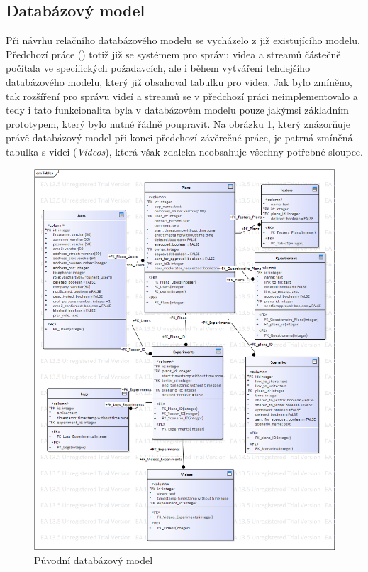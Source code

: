 \documentclass[thesis=M,czech]{FITthesis}[2012/06/26]
\begin{document}
\subsection{Databázový model} \label{subsec:navrh_backend_databaze}
Při návrhu relačního databázového modelu se vycházelo z již existujícího modelu. Předchozí práce (\cite{solankar}) totiž již se systémem pro správu videa a streamů částečně počítala ve specifických požadavcích, ale i během vytváření tehdejšího databázového modelu, který již obsahoval tabulku pro videa. Jak bylo zmíněno, tak rozšíření pro správu videí a streamů se v předchozí práci neimplementovalo a tedy i tato funkcionalita byla v databázovém modelu pouze jakýmsi základním prototypem, který bylo nutné řádně poupravit. Na obrázku \ref{img:navrh_backend_db_orig}, který znázorňuje právě databázový model při konci předchozí závěrečné práce, je patrná zmíněná tabulka s videi (\textit{Videos}), která však zdaleka neobsahuje všechny potřebné sloupce.
\\
\begin{figure}[h]\centering
	\includegraphics[width=1\textwidth]{images/db_orig.png}
	\caption{Původní databázový model}\label{img:navrh_backend_db_orig}
\end{figure}
\end{document}
